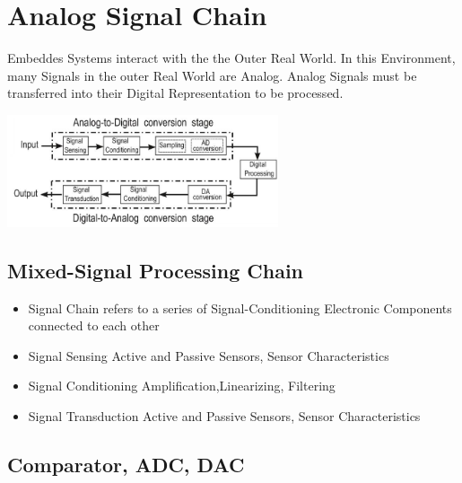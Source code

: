 \section{Analog Signal Chain}
\begin{minipage}{11cm}
	Embeddes Systems interact with the the Outer Real World. In this Environment, many Signals in the outer Real World are Analog. Analog Signals must be transferred into their Digital Representation to be processed. 
\end{minipage}
\begin{minipage}{6cm}
	\includegraphics[width=8cm]{images/signalchain.jpg}
\end{minipage}
\subsection{Mixed-Signal Processing Chain}
\begin{itemize}
	\item Signal Chain
	\subitem refers to a series of Signal-Conditioning Electronic Components connected to each other
	\item Signal Sensing
	\subitem Active and Passive Sensors, Sensor Characteristics
	\item Signal Conditioning
	\subitem Amplification,Linearizing, Filtering
	\item Signal Transduction
	\subitem Active and Passive Sensors, Sensor Characteristics
\end{itemize}
\subsection{Comparator, ADC, DAC}
